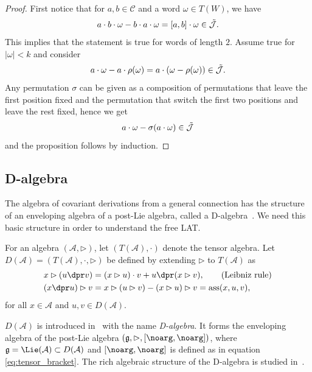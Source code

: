 \documentclass[pdftex]{sigma}
\numberwithin{equation}{section}
\begin{document}
\begin{proof}
 First notice that for $a,b \in \mathcal{C}$ and a word $\omega \in T(W)$, we have
 \[
 a\cdot b \cdot \omega - b \cdot a \cdot \omega = [a,b] \cdot \omega \in \Tilde{\mathcal{J}}.
 \]
 This implies that the statement is true for words of length $2$. Assume true for $|\omega| < k$ and consider
 \[
 a\cdot \omega - a \cdot \rho(\omega) = a \cdot (\omega - \rho(\omega) ) \in \Tilde{\mathcal{J}}.
 \]
 Any permutation $\sigma$ can be given as a composition of permutations that leave the first position fixed and the permutation that switch the first two positions and leave the rest fixed, hence we get
 \[
 a\cdot \omega - \sigma(a \cdot \omega) \in \Tilde{\mathcal{J}}
 \]
 and the proposition follows by induction.
\end{proof}

\subsection{D-algebra}%
The algebra of covariant derivations from a general connection has the structure of an enveloping algebra of a post-Lie algebra, called a D-algebra~\cite{MK_Wright_08}. We need this basic structure in order to understand the free LAT.

For an algebra $(\mathcal{A},\rhd)$, let $(T(\mathcal{A}),\cdot)$ denote the tensor algebra. Let $D(\mathcal{A}) = (T(\mathcal{A}),\cdot,\rhd)$ be defined by extending $\rhd$ to $T(\mathcal{A})$ as
\begin{align}
&x\rhd ({u\dpr v})= {(x\rhd u)\cdot v} + {u\dpr (x\rhd v)}, \qquad \mbox{(Leibniz rule)}\label{eq:DA1}\\
&({x\dpr u})\rhd v= x\rhd(u\rhd v) - (x\rhd u) \rhd v = \text{ass}(x,u,v), \label{eq:DA2}
\end{align}
for all $x\in \mathcal{A}$ and $u,v\in D(\mathcal{A})$. %

\begin{Note} $D(\mathcal{A})$ is introduced in~\cite{MK_Wright_08} with the name \emph{D-algebra}. It forms the enveloping algebra of
the post-Lie algebra $(\mathfrak{g},\rhd,[\noarg,\noarg])$, where $\mathfrak{g} = \Lie(\mathcal{A})\subset D(\mathcal{A})$ and $[ \noarg , \noarg]$ is defined as in equation \eqref{eq:tensor_bracket}. The rich algebraic structure of the D-algebra is studied in~\cite{KMKL_15,MK_Lundervold_2013,MK_Wright_08}.
\end{Note}
\end{document}
